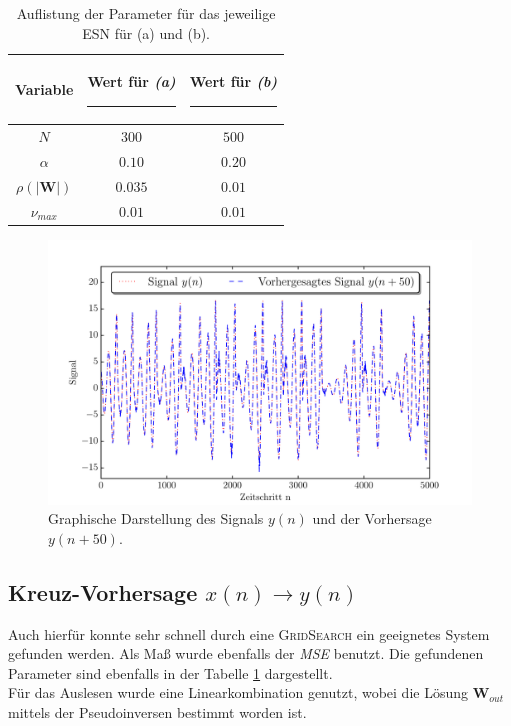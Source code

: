 \begin{table}[H]
	\centering
	\captionsetup{width=0.9\linewidth}
		\begin{tabular}{|c|c|c|}
		\rule[-1ex]{0pt}{3.5ex} Variable & \hspace{4ex} Wert für \textit{(a)} \rule[-1ex]{4ex}{0pt} & \hspace{4ex} Wert für \textit{(b)} \rule[-1ex]{4ex}{0pt}\\ 
		\hline \hline 
		\rule[-1ex]{0pt}{3.5ex} $N$ & $300$ & $500$ \\ 
		\hline 
		\rule[-1ex]{0pt}{3.5ex} $\alpha$ & $0.10$ & $0.20$ \\ 
		\hline 
		\rule[-1ex]{0pt}{3.5ex} $\rho(|\mathbf{W}|)$ & $0.035$ & $0.01$\\ 
		\hline 
		\rule[-1ex]{0pt}{3.5ex} $\nu_{max}$ & $0.01$ & $0.01$\\ 
		\hline 
	\end{tabular} 
	\caption{Auflistung der Parameter für das jeweilige \textsc{ESN} für (a) und (b).}
	\label{tab:application_roessler}
\end{table}

\vspace{-4ex}
\begin{figure}[H]
    \centering
    \includegraphics[width = 0.9 \textwidth]{figures/roessler_pred50.pdf}
    \caption{Graphische Darstellung des Signals $y(n)$ und der Vorhersage $y(n+50)$.}
    \label{fig:application_roessler_a}
\end{figure}



\subsection{Kreuz-Vorhersage $x(n) \rightarrow y(n)$}
Auch hierfür konnte sehr schnell durch eine \textsc{GridSearch} ein geeignetes System gefunden werden. Als Maß wurde ebenfalls der \textit{MSE} benutzt. Die gefundenen Parameter sind ebenfalls in der Tabelle \ref{tab:application_roessler} dargestellt.\\
Für das Auslesen wurde eine Linearkombination genutzt, wobei die Lösung $\mathbf{W}_{out}$ mittels der Pseudoinversen bestimmt worden ist.\\

